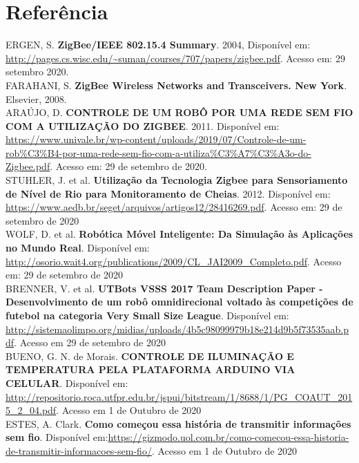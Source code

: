 \documentclass{article}
\begin{document}
\section{Referência}

ERGEN, S. \textbf{ZigBee/IEEE 802.15.4 Summary}. 2004, Disponível em: \url{http://pages.cs.wisc.edu/~suman/courses/707/papers/zigbee.pdf}. Acesso em: 29 setembro 2020.
\newline
\\
FARAHANI, S. \textbf{ZigBee Wireless Networks and Transceivers. New York}. Elsevier, 2008.
\newline
\\
ARAÚJO, D.  \textbf{CONTROLE DE UM ROBÔ POR UMA REDE SEM FIO COM A UTILIZAÇÃO DO ZIGBEE}. 2011. Disponível em: \url{https://www.univale.br/wp-content/uploads/2019/07/Controle-de-um-rob\%C3\%B4-por-uma-rede-sem-fio-com-a-utiliza\%C3\%A7\%C3\%A3o-do-Zigbee.pdf}. Acesso em: 29 de setembro de 2020.
\newline
\\
STUHLER, J. et al. \textbf{Utilização da Tecnologia Zigbee para Sensoriamento de Nível de Rio para Monitoramento de Cheias}. 2012. Disponível em: \url{https://www.aedb.br/seget/arquivos/artigos12/28416269.pdf}. Acesso em: 29 de setembro de 2020
\newline
\\
WOLF, D. et al. \textbf{Robótica Móvel Inteligente: Da Simulação às Aplicações no Mundo Real}. Disponível em: \url{http://osorio.wait4.org/publications/2009/CL_JAI2009_Completo.pdf}. Acesso em: 29 de setembro de 2020
\newline
\\
BRENNER, V. et al. \textbf{UTBots VSSS 2017 Team Description Paper -Desenvolvimento de um robô omnidirecional voltado às competições de futebol na categoria Very Small Size League}. Disponível em: \url{http://sistemaolimpo.org/midias/uploads/4b5c98099979b18e214d9b5f73535aab.pdf}. Acesso em 29 de setembro de 2020
\newline
\\
BUENO, G. N. de Morais. \textbf{CONTROLE DE ILUMINAÇÃO E TEMPERATURA PELA PLATAFORMA ARDUINO VIA CELULAR}. Disponível em: \url{http://repositorio.roca.utfpr.edu.br/jspui/bitstream/1/8688/1/PG_COAUT_2015_2_04.pdf}. Acesso em 1 de Outubro de 2020
\newline
\\
ESTES, A. Clark. \textbf{Como começou essa história de transmitir informações sem fio}. Disponível em:\url{https://gizmodo.uol.com.br/como-comecou-essa-historia-de-transmitir-informacoes-sem-fio/}. Acesso em 1 de Outubro de 2020
\end{document}
